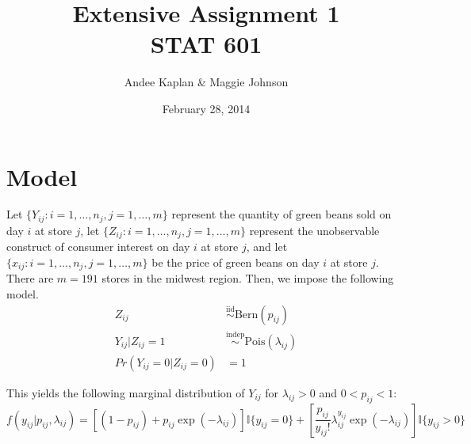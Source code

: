 \documentclass{article}\usepackage[]{graphicx}\usepackage[]{color}
\title{Extensive Assignment 1 \\ {STAT 601}}
\author{Andee Kaplan \& Maggie Johnson}
\date{February 28, 2014}
\theoremstyle{plain}
\begin{document}
\maketitle



\section*{Model}
Let $\{Y_{ij}: i=1,\dots,n_j, j=1,\dots,m\}$ represent the quantity of green beans sold on day $i$ at store $j$, let $\{Z_{ij}: i=1,\dots,n_j, j=1,\dots,m\}$ represent the unobservable construct of consumer interest on day $i$ at store $j$, and let $\{x_{ij}: i=1,\dots,n_j, j=1,\dots,m\}$ be the price of green beans on day $i$ at store $j$. There are $m=191$ stores in the midwest region. Then, we impose the following model.
\begin{align*}
Z_{ij} &\stackrel{\text{iid}}{\sim} \text{Bern}(p_{ij}) \\
Y_{ij} | Z_{ij} = 1 &\stackrel{\text{indep}}{\sim} \text{Pois}(\lambda_{ij}) \\
Pr(Y_{ij} =0| Z_{ij} = 0) &= 1
\end{align*}

This yields the following marginal distribution of $Y_{ij}$ for $\lambda_{ij} > 0$ and $0 < p_{ij} < 1$:
$$
f(y_{ij}|p_{ij}, \lambda_{ij}) = \left[(1-p_{ij}) + p_{ij} \exp(-\lambda_{ij})\right] \mathbb{I}\{y_{ij} = 0\} + \left[ \frac{p_{ij}}{y_{ij} !} \lambda_{ij}^{y_{ij}}\exp(-\lambda_{ij}) \right]\mathbb{I}\{y_{ij} > 0\}
$$
\end{document}
